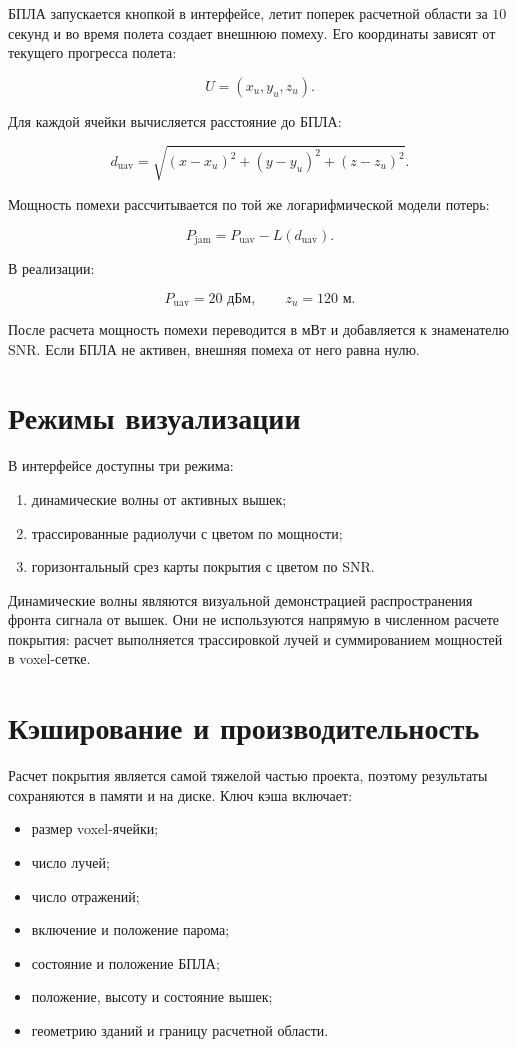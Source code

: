 \documentclass[12pt,a4paper]{article}
\begin{document}
БПЛА запускается кнопкой в интерфейсе, летит поперек расчетной области за $10$ секунд и во время полета создает внешнюю помеху. Его координаты зависят от текущего прогресса полета:

\[
U = (x_u, y_u, z_u).
\]

Для каждой ячейки вычисляется расстояние до БПЛА:

\[
d_{\text{uav}} =
\sqrt{(x - x_u)^2 + (y - y_u)^2 + (z - z_u)^2}.
\]

Мощность помехи рассчитывается по той же логарифмической модели потерь:

\[
P_{\text{jam}} = P_{\text{uav}} - L(d_{\text{uav}}).
\]

В реализации:

\[
P_{\text{uav}} = 20\text{ дБм}, \qquad z_u = 120\text{ м}.
\]

После расчета мощность помехи переводится в мВт и добавляется к знаменателю SNR. Если БПЛА не активен, внешняя помеха от него равна нулю.

\section{Режимы визуализации}

В интерфейсе доступны три режима:

\begin{enumerate}
    \item динамические волны от активных вышек;
    \item трассированные радиолучи с цветом по мощности;
    \item горизонтальный срез карты покрытия с цветом по SNR.
\end{enumerate}

Динамические волны являются визуальной демонстрацией распространения фронта сигнала от вышек. Они не используются напрямую в численном расчете покрытия: расчет выполняется трассировкой лучей и суммированием мощностей в voxel-сетке.

\section{Кэширование и производительность}

Расчет покрытия является самой тяжелой частью проекта, поэтому результаты сохраняются в памяти и на диске. Ключ кэша включает:

\begin{itemize}
    \item размер voxel-ячейки;
    \item число лучей;
    \item число отражений;
    \item включение и положение парома;
    \item состояние и положение БПЛА;
    \item положение, высоту и состояние вышек;
    \item геометрию зданий и границу расчетной области.
\end{itemize}
\end{document}
